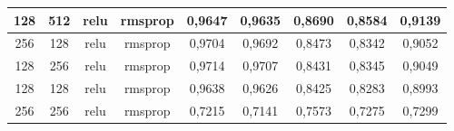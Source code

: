 \begin{table}[H]
{\begin{tabular}{|c|c|c|c|c|c|c|c|c|}
				128                                                                   & 512                                                            & relu                & rmsprop                & 0,9647                                                                 & 0,9635                                                              & 0,8690                                                                            & 0,8584                                                                         & 0,9139                                                               \\ \hline
				256                                                                   & 128                                                            & relu                & rmsprop                & 0,9704                                                                 & 0,9692                                                              & 0,8473                                                                            & 0,8342                                                                         & 0,9052                                                               \\ \hline
				128                                                                   & 256                                                            & relu                & rmsprop                & 0,9714                                                                 & 0,9707                                                              & 0,8431                                                                            & 0,8345                                                                         & 0,9049                                                               \\ \hline
				128                                                                   & 128                                                            & relu                & rmsprop                & 0,9638                                                                 & 0,9626                                                              & 0,8425                                                                            & 0,8283                                                                         & 0,8993                                                               \\ \hline
				256                                                                   & 256                                                            & relu                & rmsprop                & 0,7215                                                                 & 0,7141                                                              & 0,7573                                                                            & 0,7275                                                                         & 0,7299                                                               \\ \hline

\end{tabular}}
\end{table}
